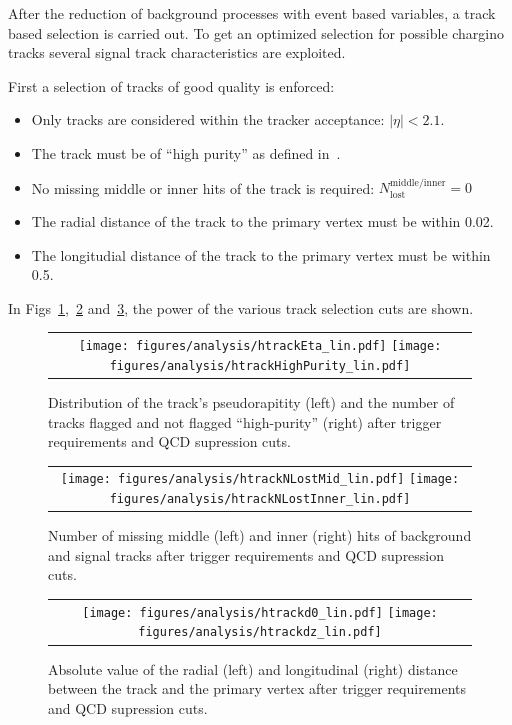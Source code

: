 After the reduction of background processes with event based variables, a track based selection is carried out.
To get an optimized selection for possible chargino tracks several signal track characteristics are exploited.

First a selection of tracks of good quality is enforced:
\begin{itemize}
\renewcommand{\labelitemi}{\footnotesize{\ding{118}}}
\item Only tracks are considered within the tracker acceptance: $|\eta|<2.1$.
\item The track must be of ``high purity'' as defined in~\cite{bib:CMS:Tracking_2010}.
\item No missing middle or inner hits of the track is required: $N_{\text{lost}}^{\text{middle/inner}}=0$
\item The radial distance of the track to the primary vertex must be within 0.02\cm.
\item The longitudial distance of the track to the primary vertex must be within  0.5\cm.
\end{itemize}
In Figs~\ref{fig:Eta_HighPurity},~\ref{fig:LostHits} and~\ref{fig:d0_dz}, the power of the various track selection cuts are shown.\\
\begin{figure}[!t]
  \centering 
  \begin{tabular}{c}
    \texttt{[image: figures/analysis/htrackEta\_lin.pdf]}
    \texttt{[image: figures/analysis/htrackHighPurity\_lin.pdf]}
  \end{tabular}
  \caption{Distribution of the track's pseudorapitity (left) and the number of tracks flagged and not flagged ``high-purity'' (right) after trigger requirements and QCD supression cuts.}
  \label{fig:Eta_HighPurity}
\end{figure}
\begin{figure}[!t]
  \centering 
  \begin{tabular}{c}
    \texttt{[image: figures/analysis/htrackNLostMid\_lin.pdf]}
    \texttt{[image: figures/analysis/htrackNLostInner\_lin.pdf]}
  \end{tabular}
  \caption{Number of missing middle (left) and inner (right) hits of background and signal tracks after trigger requirements and QCD supression cuts.}
  \label{fig:LostHits}
\end{figure}
\begin{figure}[!t]
  \centering 
  \begin{tabular}{c}
    \texttt{[image: figures/analysis/htrackd0\_lin.pdf]}
    \texttt{[image: figures/analysis/htrackdz\_lin.pdf]}
  \end{tabular}
  \caption{Absolute value of the radial (left) and longitudinal (right) distance between the track and the primary vertex after trigger requirements and QCD supression cuts.}
  \label{fig:d0_dz}
\end{figure}

